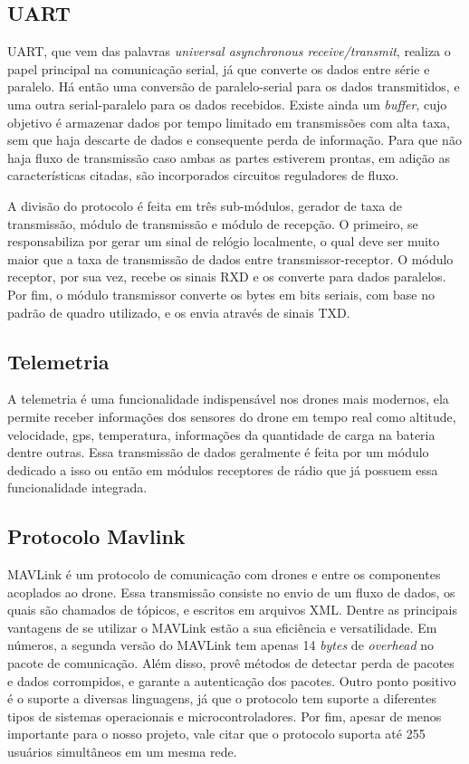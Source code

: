 \documentclass[12pt,a4paper,oneside]{book}
\begin{document}
\subsection{UART}

UART, que vem das palavras \textit{universal asynchronous receive/transmit}, realiza o papel principal na comunicação serial, já que converte os dados entre série e paralelo. Há então uma conversão de paralelo-serial para os dados transmitidos, e uma outra serial-paralelo para os dados recebidos. Existe ainda um \textit{buffer}, cujo objetivo é armazenar dados por tempo limitado em transmissões com alta taxa, sem que haja descarte de dados e consequente perda de informação. Para que não haja fluxo de transmissão caso ambas as partes estiverem prontas, em adição as características citadas, são incorporados circuitos reguladores de fluxo.

A divisão do protocolo é feita em três sub-módulos, gerador de taxa de transmissão, módulo de transmissão e módulo de recepção. O primeiro, se responsabiliza por gerar um sinal de relógio localmente, o qual deve ser muito maior que a taxa de transmissão de dados entre transmissor-receptor. O módulo receptor, por sua vez, recebe os sinais RXD e os converte para dados paralelos. Por fim, o módulo transmissor converte os bytes em bits seriais, com base no padrão de quadro utilizado, e os envia através de sinais TXD. \cite{uart}

\subsection{Telemetria}

A telemetria é uma funcionalidade indispensável nos drones mais modernos, ela permite receber informações dos sensores do drone em tempo real como altitude, velocidade, gps, temperatura, informações da quantidade de carga na bateria dentre outras. Essa transmissão de dados geralmente é feita por um módulo dedicado a isso ou então em módulos receptores de rádio que já possuem essa funcionalidade integrada.

\subsection{Protocolo Mavlink}

MAVLink é um protocolo de comunicação com drones e entre os componentes acoplados ao drone. Essa transmissão consiste no envio de um fluxo de dados, os quais são chamados de tópicos, e escritos em arquivos XML. Dentre as principais vantagens de se utilizar o MAVLink estão a sua eficiência e versatilidade. Em números, a segunda versão do MAVLink tem apenas 14 \textit{bytes} de \textit{overhead} no pacote de comunicação. Além disso, provê métodos de detectar perda de pacotes e dados corrompidos, e garante a autenticação dos pacotes. Outro ponto positivo é o suporte a diversas linguagens, já que o protocolo tem suporte a diferentes tipos de sistemas operacionais e microcontroladores. Por fim, apesar de menos importante para o nosso projeto, vale citar que o protocolo suporta até 255 usuários simultâneos em um mesma rede.
\cite{mavlink}
\end{document}
